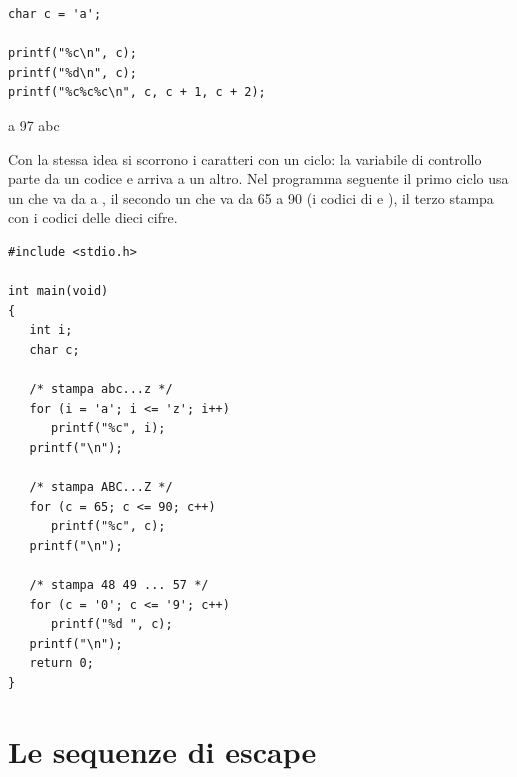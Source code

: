 \begin{affianco}[0.56][c]
\begin{lstlisting}[style=c]
char c = 'a';

printf("%c\n", c);
printf("%d\n", c);
printf("%c%c%c\n", c, c + 1, c + 2);
\end{lstlisting}
\risultato
\begin{console}[Terminale]
a
97
abc
\end{console}
\end{affianco}

Con la stessa idea si scorrono i caratteri con un ciclo: la variabile di
controllo parte da un codice e arriva a un altro. Nel programma seguente il
primo ciclo usa un  che va da  a , il secondo
un  che va da 65 a 90 (i codici di  e ), il
terzo stampa con  i codici delle dieci cifre.

\begin{affianco}[0.5]
\begin{lstlisting}[style=c, name=caratteri.c]
#include <stdio.h>

int main(void)
{
   int i;
   char c;

   /* stampa abc...z */
   for (i = 'a'; i <= 'z'; i++)
      printf("%c", i);
   printf("\n");

   /* stampa ABC...Z */
   for (c = 65; c <= 90; c++)
      printf("%c", c);
   printf("\n");

   /* stampa 48 49 ... 57 */
   for (c = '0'; c <= '9'; c++)
      printf("%d ", c);
   printf("\n");
   return 0;
}
\end{lstlisting}
\risultato
{}
\end{affianco}


\section{Le sequenze di escape}

